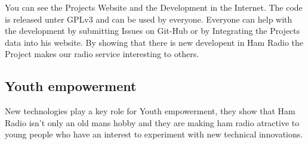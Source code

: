 You can see the Projects Website and the Development in the Internet. The 
code is released unter GPLv3 and can be used by everyone. Everyone can help 
with the development by submitting Issues on Git-Hub or by Integrating the 
Projects data into his website. By showing that there is new developent in Ham 
Radio the Project makes our radio service interesting to others.


\subsection{Youth empowerment}

New technologies play a key role for Youth empowerment, they show that Ham Radio 
isn't only an old mans hobby and they are making ham radio atractive to young people 
who have an interest to experiment with new technical innovations. 



